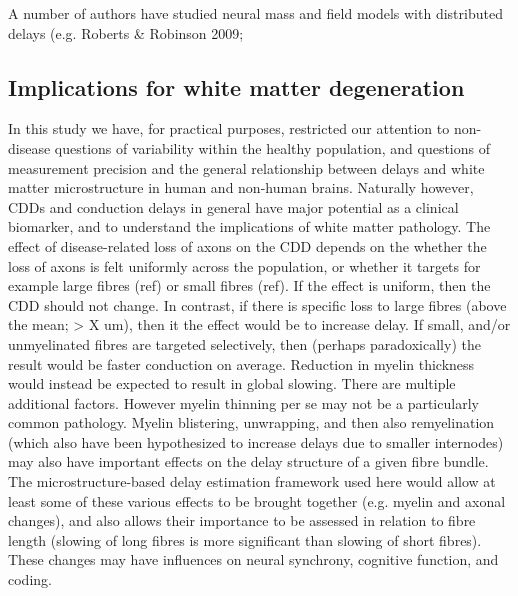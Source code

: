 A number of authors have studied neural mass and field models with distributed delays (e.g. Roberts \& Robinson 2009; 




% 


\subsection{Implications for white matter degeneration}

In this study we have, for practical purposes, restricted our attention to non-disease questions of variability within the healthy population, and questions of measurement precision and the general relationship between delays and white matter microstructure in human and non-human brains. Naturally however, CDDs and conduction delays in general have major potential as a clinical biomarker, and to understand the implications of white matter pathology. The effect of disease-related loss of axons on the CDD depends on the whether the loss of axons is felt uniformly across the population, or whether it targets for example large fibres (ref) or small fibres (ref). If the effect is uniform, then the CDD should not change. In contrast, if there is specific loss to large fibres (above the mean; > X um), then it the effect would be to increase delay. If small, and/or unmyelinated fibres are targeted selectively, then (perhaps paradoxically) the result would be faster conduction on average. Reduction in myelin thickness would instead be expected to result in global slowing. There are multiple additional factors. However myelin thinning per se may not be a particularly common pathology. Myelin blistering, unwrapping, and then also remyelination (which also have been hypothesized to increase delays due to smaller internodes) may also have important effects on the delay structure of a given fibre bundle. The microstructure-based delay estimation framework used here would allow at least some of these various effects to be brought together (e.g. myelin and axonal changes), and also allows their importance to be assessed in relation to fibre length (slowing of long fibres is more significant than slowing of short fibres).  These changes may have influences on  neural synchrony, cognitive function, and coding.



